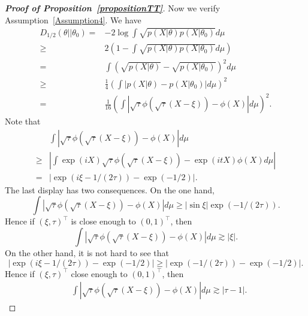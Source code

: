\documentclass[11pt]{article}
\theoremstyle{plain}
\theoremstyle{definition}
\theoremstyle{remark}
\begin{document}
\begin{appendices}
\begin{proof}[\textbf{Proof of Proposition~\ref{propositionTT}}]
Now we verify Assumption~\ref{Assumption4}.
We have
\begin{equation*}
    \begin{split}
    D_{1/2}(\theta||\theta_0)
    =&-2\log \int \sqrt{p(X|\theta)p(X|\theta_0)} d\mu
    \\
    \geq&
    2(1-\int \sqrt{p(X|\theta)p(X|\theta_0)} d\mu)
    \\
    =&\int (\sqrt{p(X|\theta)}-\sqrt{p(X|\theta_0)})^2 d\mu
    \\
    \geq&
    \frac{1}{4}
    \left(\int \left|p(X|\theta)-p(X|\theta_0)\right| d\mu\right)^2
    \\
    =&
    \frac{1}{16}
    \left(\int \left|\sqrt{\tau}\phi(\sqrt{\tau}(X-\xi))-\phi(X)\right| d\mu\right)^2
    .
\end{split}
\end{equation*}
Note that
\begin{equation*}
    \begin{split}
        &\int \left|\sqrt{\tau}\phi(\sqrt{\tau}(X-\xi))-\phi(X)\right| d\mu
        \\
    \geq &
    \left|\int  \exp(iX)\sqrt{\tau}\phi(\sqrt{\tau}(X-\xi))-\exp(itX)\phi(X) d\mu\right|
    \\
    =&\left|\exp(i\xi -1 /(2\tau))-\exp(-1/2)\right|.
\end{split}
\end{equation*}
The last display has two consequences.
On the one hand,
\begin{equation*}
    \int \left|\sqrt{\tau}\phi(\sqrt{\tau}(X-\xi))-\phi(X)\right| d\mu
    \geq
    |\sin \xi |\exp(-1/(2\tau)).
\end{equation*}
Hence if $(\xi, \tau)^\top $ is close enough to $(0,1)^\top $, then
\begin{equation*}
    \int \left|\sqrt{\tau}\phi(\sqrt{\tau}(X-\xi))-\phi(X)\right| d\mu
    \gtrsim |\xi|.
\end{equation*}
On the other hand, 
it is not hard to see that
\begin{equation*}
    \left|\exp(i\xi -1/(2\tau))-\exp(-1/2)\right|
    \geq 
    \left|\exp(-1/(2\tau))-\exp(-1/2)\right|
    .
\end{equation*}
Hence if $(\xi, \tau)^\top $ close enough to $(0,1)^\top $, then
\begin{equation*}
    \begin{split}
        &\int \left|\sqrt{\tau}\phi(\sqrt{\tau}(X-\xi))-\phi(X)\right| d\mu
    \gtrsim |\tau-1|.
\end{split}

\end{equation*}
\end{proof}
\end{appendices}
\end{document}
